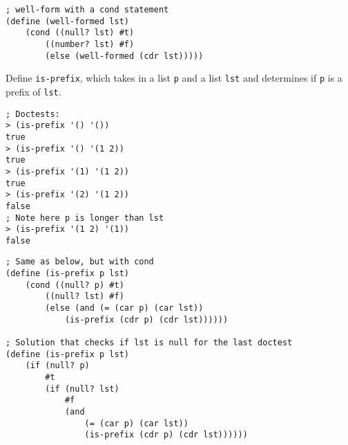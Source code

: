 \documentclass{exam}
\begin{document}
\begin{questions}
\begin{blocksection}
\begin{solution}[0.75in]
\begin{lstlisting}
; well-form with a cond statement
(define (well-formed lst)
    (cond ((null? lst) #t)
        ((number? lst) #f)
        (else (well-formed (cdr lst)))))
\end{lstlisting}
\end{solution}
\end{blocksection}

\begin{blocksection}
\question Define \texttt{is-prefix}, which takes in a list \texttt{p} and a list \texttt{lst} and determines if \texttt{p} is a prefix of \texttt{lst}.

\begin{lstlisting}
; Doctests:
> (is-prefix '() '())
true
> (is-prefix '() '(1 2))
true
> (is-prefix '(1) '(1 2))
true
> (is-prefix '(2) '(1 2))
false
; Note here p is longer than lst
> (is-prefix '(1 2) '(1))
false
\end{lstlisting}

\begin{solution}[0.5in]
\begin{lstlisting}
; Same as below, but with cond
(define (is-prefix p lst)
    (cond ((null? p) #t)
        ((null? lst) #f)
        (else (and (= (car p) (car lst))
            (is-prefix (cdr p) (cdr lst))))))

; Solution that checks if lst is null for the last doctest
(define (is-prefix p lst)
    (if (null? p)
        #t
        (if (null? lst)
            #f
            (and
                (= (car p) (car lst))
                (is-prefix (cdr p) (cdr lst))))))
\end{lstlisting}
\end{solution}
\end{blocksection}

\end{questions}

\end{document}
